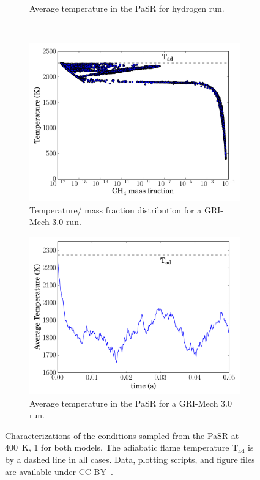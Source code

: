 \documentclass[11pt]{scrartcl}
\begin{document}
\begin{figure}[htbp]
\begin{subfigure}{0.48\textwidth}
      \caption{Average temperature in the PaSR for hydrogen run.}
  \end{subfigure}\\
  \begin{subfigure}{0.48\textwidth}
      \includegraphics[width=\linewidth]{CH4_pasr_dist.pdf}
      \caption{Temperature\slash {} mass fraction distribution for a GRI-Mech 3.0 run.}
  \end{subfigure}
  \hfill
  \begin{subfigure}{0.48\textwidth}
      \includegraphics[width=\linewidth]{CH4_pasr_tbar.pdf}
      \caption{Average temperature in the PaSR for a GRI-Mech 3.0 run.}
  \end{subfigure}
  \caption{Characterizations of the conditions sampled from the PaSR at \SI{400}{\kelvin}, \SI{1}{\atm} for both models.
  The adiabatic flame temperature $\text{T}_{\text{ad}}$ is by a dashed line in all cases.
  Data, plotting scripts, and figure files are available under CC-BY~\cite{paperscript:2017}.}
  \label{F:pasr_characterization}
\end{figure}
\end{document}
